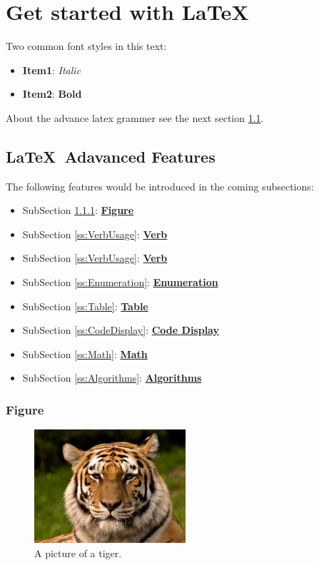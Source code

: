 \chapter{Get started with \LaTeX\ }
\label{c:GetStarted}
Two common font styles in this text: 
\begin{itemize}
    \item \textbf{Item1}: \textit{Italic}     
    \item \textbf{Item2}: \textbf{Bold}
\end{itemize}

About the advance latex grammer see the next section \ref{s:AdvancedFeatures}.


\section{\LaTeX\ Adavanced Features}
\label{s:AdvancedFeatures}
The following features would be introduced in the coming subsections:
\begin{itemize}
    \item SubSection \ref{ss:Figure}: \hyperref[ss:Figure]{\textbf{Figure}}
    \item SubSection \ref{ss:VerbUsage}: \hyperref[ss:VerbUsage]{\textbf{Verb}}
    \item SubSection \ref{ss:VerbUsage}: \hyperref[ss:VerbUsage]{\textbf{Verb}}
    \item SubSection \ref{ss:Enumeration}: \hyperref[ss:Enumeration]{\textbf{Enumeration}}
    \item SubSection \ref{ss:Table}: \hyperref[ss:Table]{\textbf{Table}}
    \item SubSection \ref{ss:CodeDisplay}: \hyperref[ss:CodeDisplay]{\textbf{Code Display}}
    \item SubSection \ref{ss:Math}: \hyperref[ss:Math]{\textbf{Math}}
    \item SubSection \ref{ss:Algorithms}: \hyperref[ss:Algorithms]{\textbf{Algorithms}}
\end{itemize}

\subsection{Figure}
\label{ss:Figure}
\begin{figure}[htpb!]
  \centering
    \includegraphics[width=0.5\textwidth]{fig/tiger.jpeg}
    \caption{\label{fig:tiger}A picture of a tiger.}
\end{figure}

